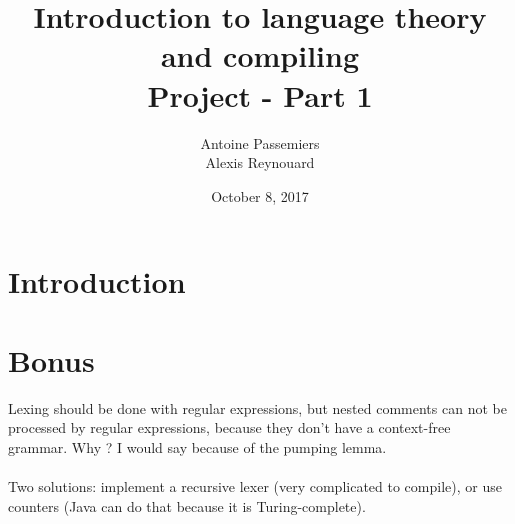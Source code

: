 \documentclass[12pt]{report}
\title{Introduction to language theory and compiling \\ Project - Part 1}
\author{Antoine Passemiers \\ Alexis Reynouard}
\date{October 8, 2017}
\begin{document}
\maketitle
\setcounter{tocdepth}{3}
\setcounter{secnumdepth}{3}
\setcounter{chapter}{0}
\tableofcontents
\pagebreak
\clearpage
\setcounter{page}{1}


\chapter{Introduction}

\chapter{Bonus}

Lexing should be done with regular expressions, but nested comments can not be processed by regular expressions, because they don't have
a context-free grammar. Why ? I would say because of the pumping lemma. \\ \\
Two solutions: implement a recursive lexer (very complicated to compile), or use counters (Java can do that because it is Turing-complete).
\end{document}
